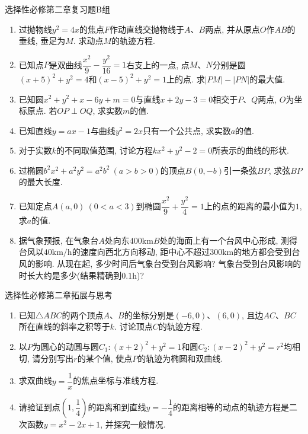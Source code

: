 \documentclass[10pt,a4paper]{article}
\begin{document}
选择性必修第二章复习题B组

\begin{enumerate}[1.]

\item 过抛物线$y^2=4x$的焦点$F$作动直线交抛物线于$A$、$B$两点, 并从原点$O$作$AB$的垂线, 垂足为$M$. 求动点$M$的轨迹方程.
\vspace*{3cm}
\item 已知点$P$是双曲线$\dfrac{x^2}9-\dfrac{y^2}{16}=1$右支上的一点, 点$M$、$N$分别是圆$(x+5)^2+y^2=4$和$(x-5)^2+y^2=1$上的点. 求$|PM|-|PN|$的最大值.
\vspace*{3cm}
\item 已知圆$x^2+y^2+x-6y+m=0$与直线$x+2y-3=0$相交于$P$、$Q$两点, $O$为坐标原点. 若$OP\perp OQ$, 求实数$m$的值.
\vspace*{3cm}
\item 已知直线$y=ax-1$与曲线$y^2=2x$只有一个公共点, 求实数$a$的值.
\vspace*{3cm}
\item 对于实数$k$的不同取值范围, 讨论方程$kx^2+y^2-2=0$所表示的曲线的形状.
\vspace*{3cm}
\item 过椭圆$b^2x^2+a^2y^2=a^2b^2 \ (a>b>0)$的顶点$B(0, -b)$引一条弦$BP$, 求弦$BP$的最大长度.
\vspace*{3cm}
\item 已知定点$A(a, 0) \ (0<a<3)$到椭圆$\dfrac{x^2}9+\dfrac{y^2}4=1$上的点的距离的最小值为$1$, 求$a$的值.
\vspace*{3cm}
\item 据气象预报, 在气象台$A$处向东$400\text{km}B$处的海面上有一个台风中心形成, 测得台风以$40\text{km}/\text{h}$的速度向西北方向移动, 距中心不超过$300\text{km}$的地方都会受到台风的影响. 从现在起, 多少时间后气象台受到台风影响?  气象台受到台风影响的时长大约是多少(结果精确到$0.1\text{h}$)?
\vspace*{3cm}
\end{enumerate}

选择性必修第二章拓展与思考

\begin{enumerate}[1.]

\item 已知$\triangle ABC$的两个顶点$A$、$B$的坐标分别是$(-6, 0)$、$(6, 0)$, 且边$AC$、$BC$所在直线的斜率之积等于$k$. 讨论顶点$C$的轨迹方程.
\vspace*{3cm}
\item 以$P$为圆心的动圆与圆$C_1: (x+2)^2+y^2=1$和圆$C_2: (x-2)^2+y^2=r^2$均相切, 请分别写出$r$的某个值, 使点$P$的轨迹为椭圆和双曲线.
\vspace*{3cm}
\item 求双曲线$y=\dfrac 1x$的焦点坐标与准线方程.
\vspace*{3cm}
\item 请验证到点$(1, \dfrac 14)$的距离和到直线$y=-\dfrac 14$的距离相等的动点的轨迹方程是二次函数$y=x^2-2x+1$, 并探究一般情况. 
\vspace*{3cm}
\end{enumerate}
\end{document}
